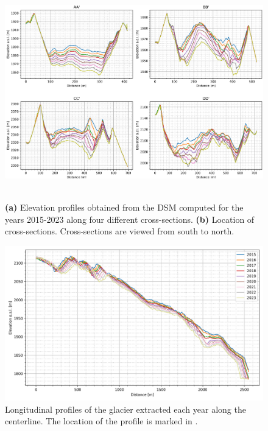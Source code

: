 \begin{figure}[p]
  \centering
  \includegraphics[width=\textwidth]{profiles.png} \\
   \\
    \caption{\textbf{(a)} Elevation profiles obtained from the DSM computed for the years 2015-2023 along four different cross-sections. \textbf{(b)} Location of cross-sections. Cross-sections are viewed from south to north.}
    \label{fig:3:profiles}
\end{figure}

\begin{figure}[ht]
  \centering
  \includegraphics[width=\textwidth]{longitudinal_profiles.png}
  \caption{Longitudinal profiles of the glacier extracted each year along the centerline. The location of the profile is marked in .}
  \label{fig:3:profile_long}
\end{figure}

